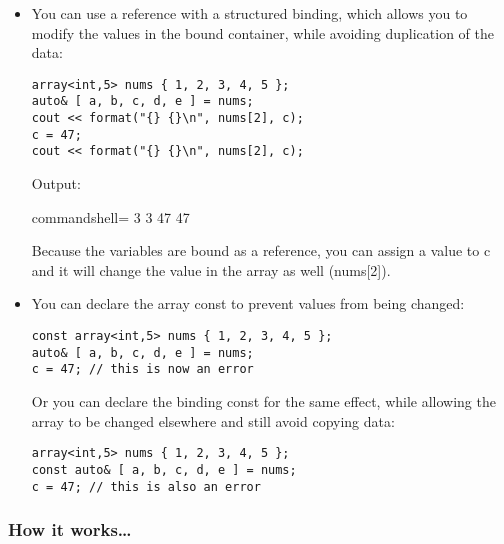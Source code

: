 \begin{itemize}
\begin{lstlisting}[style=styleCXX]
struct Things { int i{}; double d{}; string s{}; };
Things nums{ 1, 2.7, "three" };
auto [ a, b, c ] = nums;
cout << format("{} {} {}\n", a, b, c);
\end{lstlisting}

Output:

\begin{tcblisting}{commandshell={}}
1 2.7 three
\end{tcblisting}

\item 
You can use a reference with a structured binding, which allows you to modify the values in the bound container, while avoiding duplication of the data:

\begin{lstlisting}[style=styleCXX]
array<int,5> nums { 1, 2, 3, 4, 5 };
auto& [ a, b, c, d, e ] = nums;
cout << format("{} {}\n", nums[2], c);
c = 47;
cout << format("{} {}\n", nums[2], c);
\end{lstlisting}

Output:

\begin{tcblisting}{commandshell={}}
3 3
47 47
\end{tcblisting}

Because the variables are bound as a reference, you can assign a value to c and it will change the value in the array as well (nums[2]).

\item 
You can declare the array const to prevent values from being changed:

\begin{lstlisting}[style=styleCXX]
const array<int,5> nums { 1, 2, 3, 4, 5 };
auto& [ a, b, c, d, e ] = nums;
c = 47; // this is now an error
\end{lstlisting}

Or you can declare the binding const for the same effect, while allowing the array to be changed elsewhere and still avoid copying data:

\begin{lstlisting}[style=styleCXX]
array<int,5> nums { 1, 2, 3, 4, 5 };
const auto& [ a, b, c, d, e ] = nums;
c = 47; // this is also an error
\end{lstlisting}

\end{itemize}


\subsubsection{How it works…}

